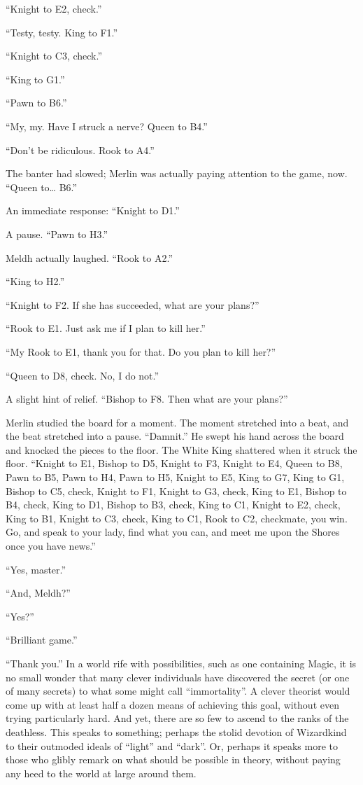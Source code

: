 “Knight to E2, check.”

“Testy, testy. King to F1.”

“Knight to C3, check.”

“King to G1.”

“Pawn to B6.”

“My, my. Have I struck a nerve? Queen to B4.”

“Don’t be ridiculous. Rook to A4.”

The banter had slowed; Merlin was actually paying attention to the game, now. “Queen to… B6.”

An immediate response: “Knight to D1.”

A pause. “Pawn to H3.”

Meldh actually laughed. “Rook to A2.”

“King to H2.”

“Knight to F2. If she has succeeded, what are your plans?”

“Rook to E1. Just ask me if I plan to kill her.”

“My Rook to E1, thank you for that. Do you plan to kill her?”

“Queen to D8, check. No, I do not.”

A slight hint of relief. “Bishop to F8. Then what are your plans?”

Merlin studied the board for a moment. The moment stretched into a beat, and the beat stretched into a pause. “Damnit.” He swept his hand across the board and knocked the pieces to the floor. The White King shattered when it struck the floor. “Knight to E1, Bishop to D5, Knight to F3, Knight to E4, Queen to B8, Pawn to B5, Pawn to H4, Pawn to H5, Knight to E5, King to G7, King to G1, Bishop to C5, check, Knight to F1, Knight to G3, check, King to E1, Bishop to B4, check, King to D1, Bishop to B3, check, King to C1, Knight to E2, check, King to B1, Knight to C3, check, King to C1, Rook to C2, checkmate, you win. Go, and speak to your lady, find what you can, and meet me upon the Shores once you have news.”

“Yes, master.”

“And, Meldh?”

“Yes?”

“Brilliant game.”

“Thank you.”
\simpleline
In a world rife with possibilities, such as one containing Magic, it is no small wonder that many clever individuals have discovered the secret (or one of many secrets) to what some might call “immortality”. A clever theorist would come up with at least half a dozen means of achieving this goal, without even trying particularly hard. And yet, there are so few to ascend to the ranks of the deathless. This speaks to something; perhaps the stolid devotion of Wizardkind to their outmoded ideals of “light” and “dark”. Or, perhaps it speaks more to those who glibly remark on what should be possible in theory, without paying any heed to the world at large around them.


